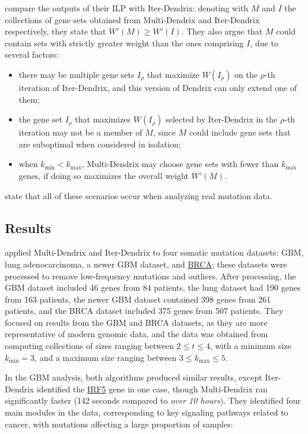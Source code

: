 \textcite{multi-dendrix} compare the outputs of their ILP with Iter-Dendrix: denoting with $M$ and $I$ the collections of gene sets obtained from Multi-Dendrix and Iter-Dendrix respectively, they state that $W'(M) \ge W'(I)$. They also argue that $M$ could contain sets with strictly greater weight than the ones comprising $I$, due to several factors:

\begin{itemize}
    \item there may be multiple gene sets $I_\rho$ that maximize $W(I_\rho)$ on the $\rho$-th iteration of Iter-Dendrix, and this version of Dendrix can only extend one of them;
    \item the gene set $I_\rho$ that maximizes $W(I_\rho)$ selected by Iter-Dendrix in the $\rho$-th iteration may not be a member of $M$, since $M$ could include gene sets that are suboptimal when considered in isolation;
    \item when $k_\mathrm{min} < k_\mathrm{max}$, Multi-Dendrix may choose gene sets with fewer than $k_\mathrm{max}$ genes, if doing so maximizes the overall weight $W'(M)$.
\end{itemize}

\textcite{multi-dendrix} state that all of these scenarios occur when analyzing real mutation data.

\subsection{Results} \label{results_multi-dendrix}

\textcite{multi-dendrix} applied Multi-Dendrix and Iter-Dendrix to four somatic mutation datasets: GBM, lung adenocarcinoma, a newer GBM dataset, and \href{https://en.wikipedia.org/wiki/Breast_cancer}{BRCA}; these datasets were processed to remove low-frequency mutations and outliers. After processing, the GBM dataset included 46 genes from 84 patients, the lung dataset had 190 genes from 163 patients, the newer GBM dataset contained 398 genes from 261 patients, and the BRCA dataset included 375 genes from 507 patients. They focused on results from the GBM and BRCA datasets, as they are more representative of modern genomic data, and the data was obtained from computing collections of sizes ranging between $2 \le t \le 4$, with a minimum size $k_\mathrm {min} = 3$, and a maximum size ranging between $3 \le k_\mathrm{max} \le 5$.

In the GBM analysis, both algorithms produced similar results, except Iter-Dendrix identified the \href{https://en.wikipedia.org/wiki/IRF5}{IRF5} gene in one case, though Multi-Dendrix ran significantly faster (142 seconds compared to \textit{over 10 hours}). They identified four main modules in the data, corresponding to key signaling pathways related to cancer, with mutations affecting a large proportion of samples:

